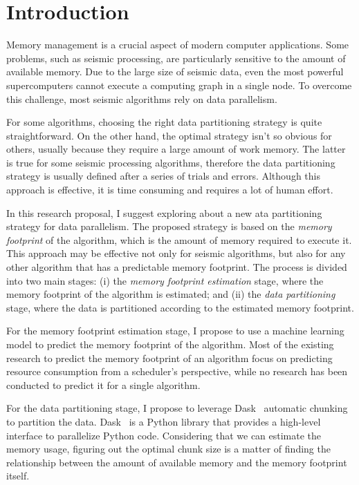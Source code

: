 \section{Introduction}
\label{sec:introduction}

Memory management is a crucial aspect of modern computer applications.
Some problems, such as seismic processing, are particularly sensitive to the amount of available memory.
Due to the large size of seismic data, even the most powerful supercomputers cannot execute a computing graph in a single node.
To overcome this challenge, most seismic algorithms rely on data parallelism.

For some algorithms, choosing the right data partitioning strategy is quite straightforward.
On the other hand, the optimal strategy isn't so obvious for others, usually because they require a large amount of work memory.
The latter is true for some seismic processing algorithms, therefore the data partitioning strategy is usually defined after a series of trials and errors.
Although this approach is effective, it is time consuming and requires a lot of human effort.

In this research proposal, I suggest exploring about a new ata partitioning strategy for data parallelism.
The proposed strategy is based on the \emph{memory footprint} of the algorithm, which is the amount of memory required to execute it.
This approach may be effective not only for seismic algorithms, but also for any other algorithm that has a predictable memory footprint.
The process is divided into two main stages:
(i) the \emph{memory footprint estimation} stage, where the memory footprint of the algorithm is estimated; and
(ii) the \emph{data partitioning} stage, where the data is partitioned according to the estimated memory footprint.

For the memory footprint estimation stage, I propose to use a machine learning model to predict the memory footprint of the algorithm.
Most of the existing research to predict the memory footprint of an algorithm focus on predicting resource consumption from a scheduler's perspective, while no research has been conducted to predict it for a single algorithm.

For the data partitioning stage, I propose to leverage Dask~\cite{dask} automatic chunking to partition the data.
Dask~\cite{dask} is a Python library that provides a high-level interface to parallelize Python code.
Considering that we can estimate the memory usage, figuring out the optimal chunk size is a matter of finding the relationship between the amount of available memory and the memory footprint itself.

